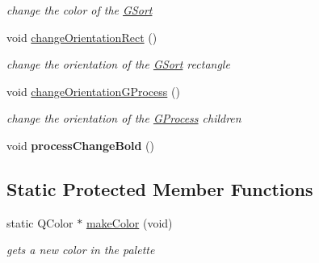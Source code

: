 \begin{DoxyCompactItemize}
\begin{DoxyCompactList}\small\item\em change the color of the \hyperlink{classGSort}{G\+Sort} \end{DoxyCompactList}\item 
\hypertarget{classGSort_a2c14e5aa71f7353f18700819f038e542}{void \hyperlink{classGSort_a2c14e5aa71f7353f18700819f038e542}{change\+Orientation\+Rect} ()}\label{classGSort_a2c14e5aa71f7353f18700819f038e542}

\begin{DoxyCompactList}\small\item\em change the orientation of the \hyperlink{classGSort}{G\+Sort} rectangle \end{DoxyCompactList}\item 
\hypertarget{classGSort_a7a98e4937870f2b5cceacebc1b3ccfff}{void \hyperlink{classGSort_a7a98e4937870f2b5cceacebc1b3ccfff}{change\+Orientation\+G\+Process} ()}\label{classGSort_a7a98e4937870f2b5cceacebc1b3ccfff}

\begin{DoxyCompactList}\small\item\em change the orientation of the \hyperlink{classGProcess}{G\+Process} children \end{DoxyCompactList}\item 
\hypertarget{classGSort_a4250ae248bbf752f2af240d5c88e3a9b}{void {\bfseries process\+Change\+Bold} ()}\label{classGSort_a4250ae248bbf752f2af240d5c88e3a9b}

\end{DoxyCompactItemize}
\subsection*{Static Protected Member Functions}
\begin{DoxyCompactItemize}
\item 
static Q\+Color $\ast$ \hyperlink{classGSort_a8df1bb3e016f20eaf6f195dc3055e49e}{make\+Color} (void)
\begin{DoxyCompactList}\small\item\em gets a new color in the palette \end{DoxyCompactList}\end{DoxyCompactItemize}
